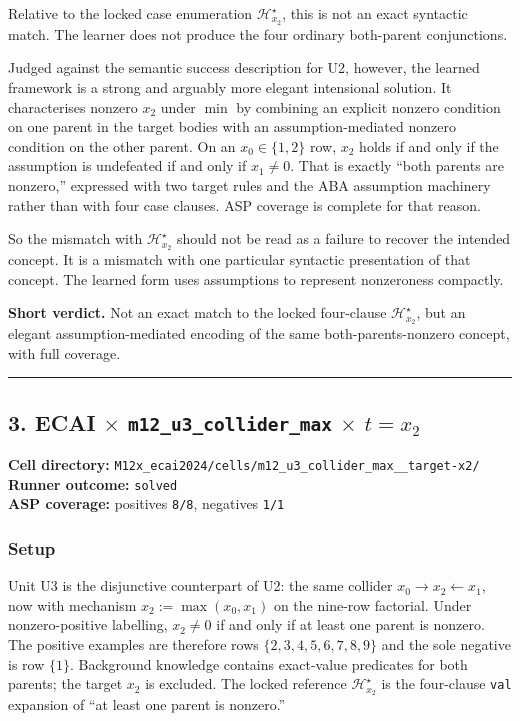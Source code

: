 \documentclass[11pt]{article}
\begin{document}
Relative to the locked case enumeration \(\mathcal{H}_{x_2}^\star\), this is not an exact syntactic match. The learner does not produce the four ordinary both-parent conjunctions.

Judged against the semantic success description for U2, however, the learned framework is a strong and arguably more elegant intensional solution. It characterises nonzero \(x_2\) under \(\min\) by combining an explicit nonzero condition on one parent in the target bodies with an assumption-mediated nonzero condition on the other parent. On an \(x_0\in\{1,2\}\) row, \(x_2\) holds if and only if the assumption is undefeated if and only if \(x_1\neq 0\). That is exactly ``both parents are nonzero,'' expressed with two target rules and the ABA assumption machinery rather than with four case clauses. ASP coverage is complete for that reason.

So the mismatch with \(\mathcal{H}_{x_2}^\star\) should not be read as a failure to recover the intended concept. It is a mismatch with one particular syntactic presentation of that concept. The learned form uses assumptions to represent nonzeroness compactly.

\textbf{Short verdict.} Not an exact match to the locked four-clause \(\mathcal{H}_{x_2}^\star\), but an elegant assumption-mediated encoding of the same both-parents-nonzero concept, with full coverage.

\medskip\hrule\medskip

\subsection{\texorpdfstring{3. ECAI \(\times\) \texttt{m12\_u3\_collider\_max} \(\times\) \(t=x_2\)}{3. ECAI - m12-u3-collider-max - target x2}}

\textbf{Cell directory:} \texttt{M12x\_ecai2024/cells/m12\_u3\_collider\_max\_\_target-x2/}\\
\textbf{Runner outcome:} \texttt{solved}\\
\textbf{ASP coverage:} positives \texttt{8/8}, negatives \texttt{1/1}

\subsubsection{Setup}

Unit U3 is the disjunctive counterpart of U2: the same collider \(x_0\to x_2\leftarrow x_1\), now with mechanism \(x_2:=\max(x_0,x_1)\) on the nine-row factorial. Under nonzero-positive labelling, \(x_2\neq 0\) if and only if at least one parent is nonzero. The positive examples are therefore rows \(\{2,3,4,5,6,7,8,9\}\) and the sole negative is row \(\{1\}\). Background knowledge contains exact-value predicates for both parents; the target \(x_2\) is excluded. The locked reference \(\mathcal{H}_{x_2}^\star\) is the four-clause \texttt{val} expansion of ``at least one parent is nonzero.''
\end{document}
